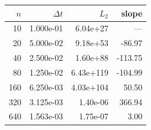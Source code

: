 \begin{tabular}{rrrr}
\toprule
$n$ & $\Delta t$ & $L_2$ & slope \\
\midrule
10 & 1.000e-01 & 6.04e+27 & --- \\
20 & 5.000e-02 & 9.18e+53 & -86.97 \\
40 & 2.500e-02 & 1.60e+88 & -113.75 \\
80 & 1.250e-02 & 6.43e+119 & -104.99 \\
160 & 6.250e-03 & 4.03e+104 & 50.50 \\
320 & 3.125e-03 & 1.40e-06 & 366.94 \\
640 & 1.563e-03 & 1.75e-07 & 3.00 \\
\bottomrule
\end{tabular}
